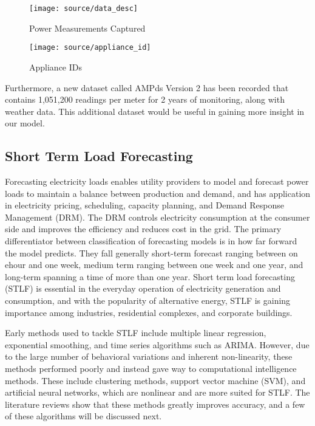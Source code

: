 \documentclass[12pt,twocolumn]{article}
\begin{document}
				\begin{figure}[!htbp]
					\centering
					\texttt{[image: source/data\_desc]}
					\caption{Power Measurements Captured}
					\label{fig:varnorm}
				\end{figure}

				\begin{figure}[!h]
					\centering
					\texttt{[image: source/appliance\_id]}
					\caption{Appliance IDs}
					\label{fig:varnorm}
				\end{figure}

				\quad Furthermore, a new dataset called AMPds Version 2 has been recorded that contains 1,051,200 readings per meter for 2 years of monitoring, along with weather data. This additional dataset would be useful in gaining more insight in our model. 

		\subsection{Short Term Load Forecasting}

			\quad Forecasting electricity loads enables utility providers to model and forecast power loads to maintain a balance between production and demand, and has application in electricity pricing, scheduling, capacity planning, and Demand Response Management (DRM). The DRM controls electricity consumption at the consumer side and improves the efficiency and reduces cost in the grid. The primary differentiator between classification of forecasting models is in how far forward the model predicts. They fall generally short-term forecast ranging between on ehour and one week, medium term ranging between one week and one year, and long-term spanning a time of more than one year. Short term load forecasting (STLF) is essential in the everyday operation of electricity generation and consumption, and with the popularity of alternative energy, STLF is gaining importance among industries, residential complexes, and corporate buildings. \newline

			\quad Early methods used to tackle STLF include multiple linear regression, exponential smoothing, and time series algorithms such as ARIMA. However, due to the large number of behavioral variations and inherent non-linearity, these methods performed poorly and instead gave way to computational intelligence methods. These include clustering methods, support vector machine (SVM), and artificial neural networks, which are nonlinear and are more suited for STLF. The literature reviews show that these methods greatly improves accuracy, and a few of these algorithms will be discussed next.
\end{document}
